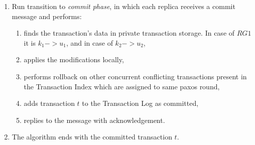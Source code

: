 \begin{enumerate}
\item Run transition to \emph{commit phase}, in which each replica receives a commit message and performs:

	\begin{enumerate}
		\item finds the transaction's data in private transaction storage. In case of $RG1$ it is $k_{1} -> u_{1}$, and in case of $k_{2} -> u_{2}$,
		\item applies the modifications locally,
		\item performs rollback on other concurrent conflicting transactions present in the Transaction Index which are assigned to same paxos round,
		\item adds transaction $t$ to the Transaction Log as committed,
		\item replies to the message with acknowledgement.
	\end{enumerate}

\item The algorithm ends with the committed transaction $t$.

\end{enumerate}






